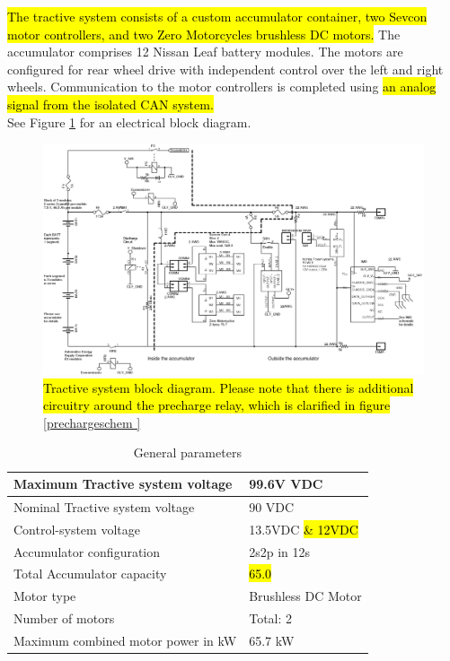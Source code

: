 \documentclass{article}
\DeclareRobustCommand{\hlr}[1]{{\sethlcolor{red}\hl{#1}}}
\begin{document}
    \hlr{The tractive system consists of a custom accumulator container, two Sevcon motor controllers, and two Zero Motorcycles brushless DC motors.} The accumulator comprises 12 Nissan Leaf battery modules. The motors are configured for rear wheel drive with independent control over the left and right wheels. Communication to the motor controllers is completed using \hlr{an analog signal from the isolated CAN system.}\\

    See Figure \ref{tractive} for an electrical block diagram.

        \begin{figure}
            \includegraphics[width=\textheight]{tractiveblock}
            \caption{\hlr{Tractive system block diagram. Please note that there is additional circuitry around the precharge relay, which is clarified in figure} \ref{prechargeschem
            }}
            \label{tractive}
        \end{figure}

        \begin{table}[H]
            \centering
            \begin{tabular}{|l|l|}
            \hline
                Maximum Tractive system voltage & 99.6V VDC \\ \hline
                Nominal Tractive system voltage & 90 VDC \\ \hline
                Control-system voltage & 13.5VDC \hlr{\& 12VDC}\\ \hline
                Accumulator configuration & 2s2p in 12s \\ \hline
                Total Accumulator capacity & \hlr{65.0} \\ \hline
                Motor type & Brushless DC Motor \\ \hline
                Number of motors & Total: 2 \\ \hline
                Maximum combined motor power in kW & 65.7 kW \\ \hline
            \end{tabular}
            \caption{General parameters}
            \label{systemtable}
        \end{table}
\end{document}
